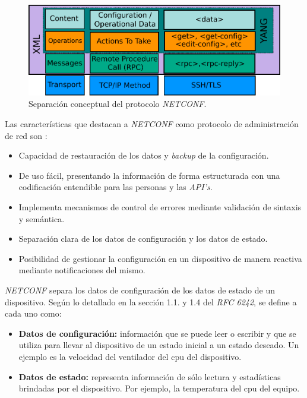 \begin{figure}[htbp]
	\centering
	\includegraphics[scale=0.8]{Figures/stack-netconf.pdf}
	\caption{Separación conceptual del protocolo \textit{NETCONF}.}
	\label{fig:netconf}
  \end{figure}


  Las características que destacan a \textit{NETCONF} como protocolo de administración de red son \parencite{netconfpros}:

  \begin{itemize}
	\item Capacidad de restauración de los datos y \textit{backup} de la configuración.
	\item De uso fácil, presentando la información de forma estructurada con una codificación entendible para las personas y las \textit{API’s}.
	\item Implementa mecanismos de control de errores mediante validación de sintaxis y semántica.
	\item Separación clara de los datos de configuración y los datos de estado.
	\item Posibilidad de gestionar la configuración en un dispositivo de manera reactiva mediante notificaciones del mismo.
\end{itemize}

\textit{NETCONF} separa los datos de configuración de los datos de estado de un dispositivo. Según lo detallado en la sección 1.1. y 1.4 del \textit{RFC 6242}, se define a cada uno como:

\begin{itemize}
	\item \textbf{Datos de configuración:} información que se puede leer o escribir y que se utiliza para llevar al dispositivo de un estado inicial a un estado deseado. Un ejemplo es la velocidad del ventilador del cpu del dispositivo.  
	\item \textbf{Datos de estado:} representa información de sólo lectura y estadísticas brindadas por el dispositivo. Por ejemplo, la temperatura del cpu del equipo.   
\end{itemize}

